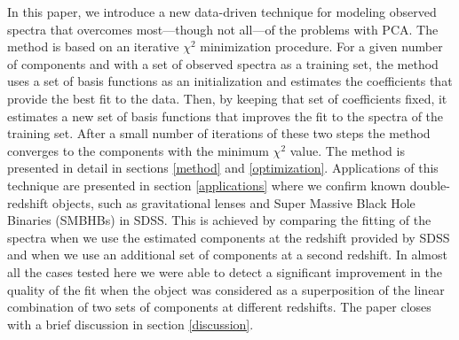 \documentclass[apj]{emulateapj}
\begin{document}
In this paper, we introduce a new data-driven technique for modeling observed spectra that overcomes most---though not all---of the problems with PCA. The method is based on an iterative $\chi^2$ minimization procedure. For a given number of components and with a set of observed spectra as a training set, the method uses a set of basis functions as an initialization and estimates the coefficients that provide the best fit to the data. Then, by keeping that set of coefficients fixed, it estimates a new set of basis functions that improves the fit to the spectra of the training set. After a small number of iterations of these two steps the method converges to the components with the minimum $\chi^2$ value. The method is presented in detail in sections \ref{method} and \ref{optimization}. Applications of this technique are presented in section \ref{applications} where we confirm known double-redshift objects, such as gravitational lenses and Super Massive Black Hole Binaries (SMBHBs) in SDSS. This is achieved by comparing the fitting of the spectra when we use the estimated components at the redshift provided by SDSS and when we use an additional set of components at a second redshift. In almost all the cases tested here we were able to detect a significant improvement in the quality of the fit when the object was considered as a superposition of the linear combination of two sets of components at different redshifts. The paper closes with a brief discussion in section \ref{discussion}.
\end{document}

